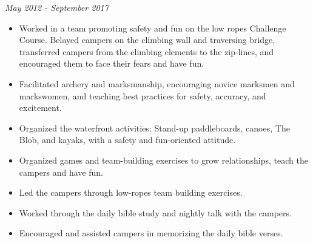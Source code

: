 \documentclass[letterpaper,10pt]{article}
\providecommand{\tightlist}
  {\setlength{\itemsep}{4pt}\setlength{\parskip}{0pt}}
\begin{document}
    \hfill \emph{May 2012 - September 2017}

    \begin{itemize}
        \tightlist{}
        \item
        Worked in a team promoting safety and fun on the low ropes Challenge Course.
        Belayed campers on the climbing wall and traversing bridge, transferred campers from the climbing elements to the zip-lines, and encouraged them to face their fears and have fun.
        \item
        Facilitated archery and marksmanship, encouraging novice marksmen and markswomen, and teaching best practices for safety, accuracy, and excitement.
        \item
        Organized the waterfront activities: Stand-up paddleboards, canoes, The Blob, and kayaks, with a safety and fun-oriented attitude.
        \item
        Organized games and team-building exercises to grow relationships, teach the campers and have fun.
        \item
        Led the campers through low-ropes team building exercises.
        \item
        Worked through the daily bible study and nightly talk with the campers.
        \item
        Encouraged and assisted campers in memorizing the daily bible verses.
    \end{itemize}
\end{document}

